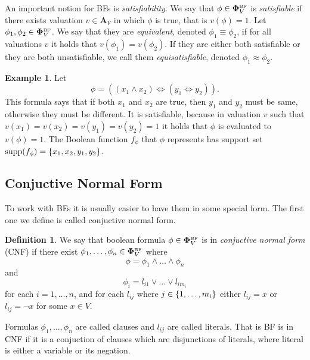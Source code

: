 \documentclass[
  digital, %
  twoside, %
  table,   %
  nolof,     %
  nolot,     %
]{fithesis3}
\let\setbuilder\set
\newcommand{\simpleset}[1]{\{{#1}\}}
\renewcommand{\set}[1]{\normalexpandarg\IfSubStr{#1}{|}{\setbuilder{#1}}{\simpleset{#1}}}
\theoremstyle{definition}
\newtheorem{definition}{Definition}
\newtheorem{example}{Example}
\theoremstyle{remark}
\newcommand{\BF}[1]{\mathbf{\Phi}_{#1}^{\normalfont{\text{\tiny BF}}}}
\newcommand{\valtns}[1]{\mathbf{A}_{#1}}
\newcommand{\supp}[1]{\mathrm{supp}(#1)}
\newcommand{\lequal}{\Leftrightarrow}
\begin{document}
An important notion for BFs is \emph{satisfiability}. We say that $\phi \in \BF{V}$ is \emph{satisfiable} if there exists valuation $v \in \valtns{V}$ in which $\phi$ is true, that is $v(\phi) = 1$. Let $\phi_1, \phi_2 \in \BF{V}$. We say that they are \emph{equivalent}, denoted $\phi_1 \equiv \phi_2$, if for all valuations $v$ it holds that $v(\phi_1) = v(\phi_2)$. If they are either both satisfiable or they are both unsatisfiable, we call them \emph{equisatisfiable}, denoted $\phi_1 \approx \phi_2$. %

\begin{example}
\label{ex:BF:prenex}
Let
\[\phi = ((x_1 \land x_2) \lequal (y_1 \lequal y_2)).\]
This formula says that if both $x_1$ and $x_2$ are true, then $y_1$ and $y_2$ must be same, otherwise they must be different. It is satisfiable, because in valuation $v$ such that $v(x_1) = v(x_2) = v(y_1) = v(y_2) = 1$ it holds that $\phi$ is evaluated to $v(\phi)=1$. The Boolean function $f_{\phi}$ that $\phi$ represents has support set $\supp{f_{\phi}} = \set{x_1, x_2, y_1, y_2}$.
\end{example}

\subsection{Conjuctive Normal Form}
\label{sec:BF:CNF}
To work with BFs it is usually easier to have them in some special form. The first one we define is called conjuctive normal form.

\begin{definition}
We say that boolean formula $\phi \in \BF{V}$ is in \emph{conjuctive normal form} (CNF) if there exist $\phi_1,\dots,\phi_n \in \BF{V}$ where
\[\phi = \phi_1 \land \dots \land \phi_n\]
and
\[\phi_i = l_{i1} \lor \dots \lor l_{i{m_i}}\]
for each $i = 1, \dots, n$, and for each $l_{ij}$ where $j \in \set{1,\dots,m_i}$ either $l_{ij} = x$ or $l_{ij} = \neg x$ for some $x \in V$.
\end{definition}
Formulas $\phi_1,\dots,\phi_n$ are called clauses and $l_{ij}$ are called literals. That is BF is in CNF if it is a conjuction of clauses which are disjunctions of literals, where literal is either a variable or its negation.
\end{document}

